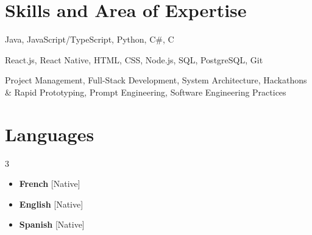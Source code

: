 \documentclass[10pt,a4paper,sans]{moderncv}
\begin{document}
\section{Skills and Area of Expertise}
\begin{description}[leftmargin=0cm, style=unboxed]

    \item[\textbf{Programming Skills:}] Java, JavaScript/TypeScript, Python, C\#, C
    \vspace{-1.5mm}
    \item[\textbf{Other:}] React.js, React Native, HTML, CSS, Node.js, SQL, PostgreSQL, Git
    \vspace{-1.5mm}
    \item[\textbf{Leadership and Software Engineering:}] Project Management, Full-Stack Development, System Architecture, Hackathons \& Rapid Prototyping, Prompt Engineering, Software Engineering Practices
\end{description}





\section{Languages}
\begin{minipage}{\textwidth}
\begin{multicols}{3}
\begin{itemize}[label=\textbullet]
\item \textbf{French} [Native]
\item \textbf{English} [Native]
\item \textbf{Spanish} [Native]


\end{itemize}
\end{multicols}
\end{minipage}
\end{document}
